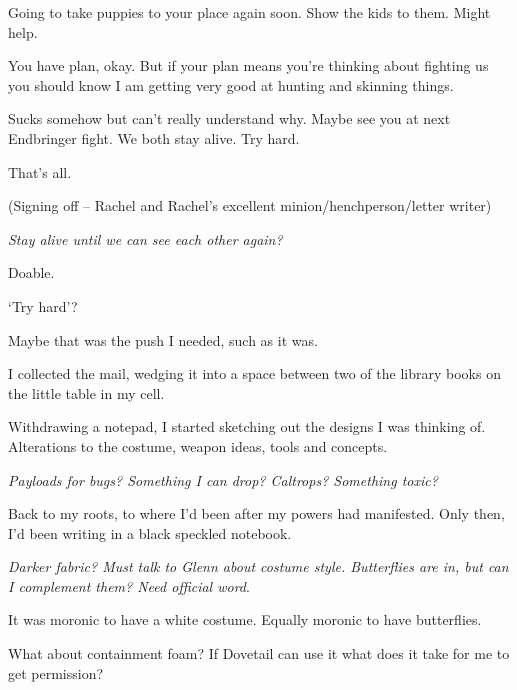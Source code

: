 Going to take puppies to your place again soon.  Show the kids to them.  Might help.



You have plan, okay.  But if your plan means you're thinking about fighting us you should know I am getting very good at hunting and skinning things.



Sucks somehow but can't really understand why.  Maybe see you at next Endbringer fight.  We both stay alive.  Try hard.



That's all.



(Signing off – Rachel and Rachel's excellent minion/henchperson/letter writer)



\emph{Stay alive until we can see each other again?}



Doable.



`Try hard'?



Maybe that was the push I needed, such as it was.



I collected the mail, wedging it into a space between two of the library books on the little table in my cell.



Withdrawing a notepad, I started sketching out the designs I was thinking of.  Alterations to the costume, weapon ideas, tools and concepts.



\emph{Payloads for bugs?  Something I can drop?  Caltrops?  Something toxic?}



Back to my roots, to where I'd been after my powers had manifested.  Only then, I'd been writing in a black speckled notebook.



\emph{Darker fabric?  Must talk to Glenn about costume style.  Butterflies are in, but can I complement them?  Need official word}.



It was moronic to have a white costume.  Equally moronic to have butterflies.



What about containment foam?  If Dovetail can use it what does it take for me to get permission?



